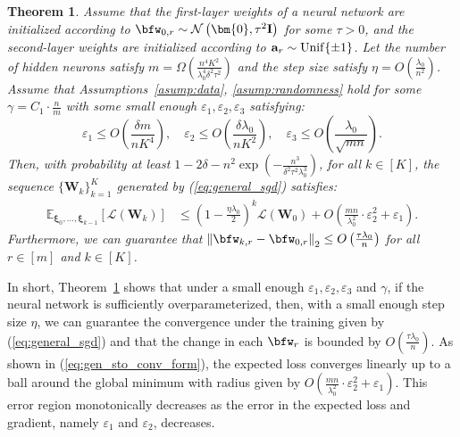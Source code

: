 \documentclass[10pt]{article} %
\newtheorem{theorem}{Theorem}[section]
\theoremstyle{definition}
\theoremstyle{plain}
\newcommand{\paren}[1]{\left(#1\right)}
\newcommand{\norm}[1]{\left\|#1\right\|}
\providecommand{\E}{\mathbb{E}}
\def\calL{{\mathcal{L}}}
\def\bfI{{\mathbf{I}}}\def\bfJ{{\mathbf{J}}}\def\bfK{{\mathbf{K}}}\def\bfL{{\mathbf{L}}}
\def\bfa{{\mathbf{a}}}\def\bfb{{\mathbf{b}}}\def\bfc{{\mathbf{c}}}\def\bfd{{\mathbf{d}}}
\begin{document}
\begin{theorem}
    \label{thm:gen_sto_conv}
    Assume that the first-layer weights of a neural network are initialized according to $\bfw_{0,r}\sim\mathcal{N}\paren{\bm{0}, \tau^2\bfI}$ for some $\tau > 0$, and the second-layer weights are initialized according to $\bfa_r\sim{\rm Unif}\{\pm 1\}$. 
    Let the number of hidden neurons satisfy $m = \Omega\paren{\frac{n^4K^2}{\lambda_0^4\delta^2\tau^2}}$ and the step size satisfy $\eta = O\paren{\frac{\lambda_0}{n^2}}$. 
    Assume that Assumptions~\ref{asump:data}, \ref{asump:randomness} hold for some $\gamma = C_1\cdot\frac{n}{m}$ with some small enough $\varepsilon_1, \varepsilon_2, \varepsilon_3$ satisfying:
    \begin{equation}
        \varepsilon_1\leq O\paren{\frac{\delta m}{nK^4}}, \quad \varepsilon_2 \leq O\paren{\frac{\delta\lambda_0}{nK^2}}, \quad \varepsilon_3\leq O\paren{\frac{\lambda_0}{\sqrt{mn}}}.
    \end{equation}
    Then, with probability at least $1 - 2\delta - n^2\exp\paren{-\frac{n^3}{\delta^2\tau^2\lambda_0^3}}$, for all $k\in[K]$, the sequence $\{\mathbf{W}_k\}_{k=1}^K$ generated by (\ref{eq:general_sgd}) satisfies:
    \begin{equation}
        \label{eq:gen_sto_conv_form}
        \begin{aligned}
            \E_{\bm{\xi}_0,\dots,\bm{\xi}_{k-1}}\left[\calL\paren{\mathbf{W}_k}\right] & \leq \paren{1 - \frac{\eta\lambda_0}{2}}^k\calL\paren{\mathbf{W}_0}+ O\paren{\frac{mn}{\lambda_0^2}\cdot\varepsilon_2^2 + \varepsilon_1}.
        \end{aligned}
    \end{equation}
    Furthermore, we can guarantee that $\norm{\bfw_{k,r} - \bfw_{0,r}}_2\leq O\paren{\frac{\tau\lambda_0}{n}}$ for all $r\in[m]$ and $k\in[K]$.
\end{theorem}
In short, Theorem~\ref{thm:gen_sto_conv} shows that under a small enough $\varepsilon_1,\varepsilon_2, \varepsilon_3$ and $\gamma$, if the neural network is sufficiently overparameterized, then, with a small enough step size $\eta$, we can guarantee the convergence under the training given by (\ref{eq:general_sgd}) and that the change in each $\bfw_r$ is bounded by $O\paren{\frac{\tau\lambda_0}{n}}$. 
As shown in (\ref{eq:gen_sto_conv_form}), the expected loss converges linearly up to a ball around the global minimum with radius given by $O\paren{\frac{mn}{\lambda_0^2}\cdot\varepsilon_2^2 + \varepsilon_1}$. 
This error region monotonically decreases as the error in the expected loss and gradient, namely $\varepsilon_1$ and $\varepsilon_2$, decreases.
\end{document}
